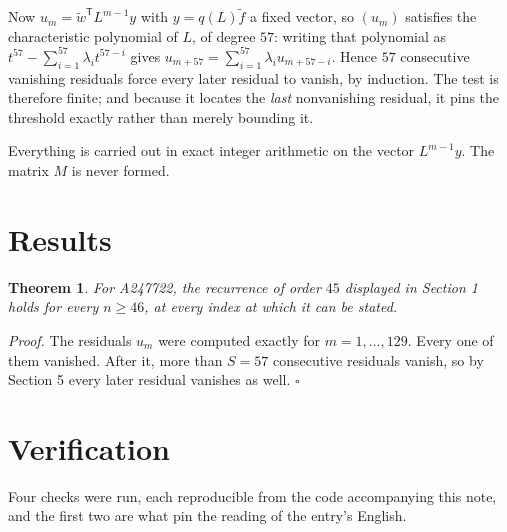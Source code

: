 \documentclass[11pt]{article}
\newtheorem{theorem}{Theorem}
\theoremstyle{definition}
\begin{document}
Now $u_m = \tilde w^{\mathsf T} L^{m-1} y$ with $y = q(L)\tilde f$ a fixed vector, so $(u_m)$ satisfies the characteristic polynomial of $L$, of degree $57$: writing that polynomial as $t^{57} - \sum_{i=1}^{57} \lambda_i t^{57-i}$ gives $u_{m+57} = \sum_{i=1}^{57} \lambda_i u_{m+57-i}$. Hence $57$ consecutive vanishing residuals force every later residual to vanish, by induction. The test is therefore finite; and because it locates the {\itshape last} nonvanishing residual, it pins the threshold exactly rather than merely bounding it.

Everything is carried out in exact integer arithmetic on the vector $L^{m-1}y$. The matrix $M$ is never formed.

\section{Results}

\begin{theorem} For A247722, the recurrence of order $45$ displayed in Section 1 holds for every $n \ge 46$, at every index at which it can be stated.\end{theorem}

{\itshape Proof.} The residuals $u_m$ were computed exactly for $m = 1,\dots,129$. Every one of them vanished. After it, more than $S = 57$ consecutive residuals vanish, so by Section 5 every later residual vanishes as well. $\square$

\section{Verification}

Four checks were run, each reproducible from the code accompanying this note, and the first two are what pin the reading of the entry's English.
\end{document}
